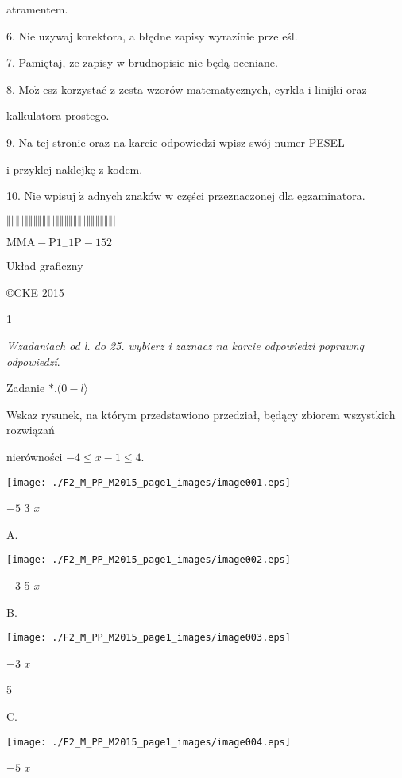 \documentclass[a4paper,12pt]{article}
\begin{document}
atramentem.

6. Nie uzywaj korektora, a błędne zapisy wyrazínie prze eśl.

7. Pamiętaj, $\dot{\mathrm{z}}\mathrm{e}$ zapisy w brudnopisie nie będą oceniane.

8. $\mathrm{M}\mathrm{o}\dot{\mathrm{z}}$ esz korzystać z zesta wzorów matematycznych, cyrkla i linijki oraz

kalkulatora prostego.

9. Na tej stronie oraz na karcie odpowiedzi wpisz swój numer PESEL

i przyklej naklejkę z kodem.

10. Nie wpisuj $\dot{\mathrm{z}}$ adnych znaków w części przeznaczonej dla egzaminatora.

$\Vert\Vert\Vert\Vert\Vert\Vert\Vert\Vert\Vert\Vert\Vert\Vert\Vert\Vert\Vert\Vert\Vert\Vert\Vert\Vert\Vert\Vert\Vert\Vert|$

$\mathrm{M}\mathrm{M}\mathrm{A}-\mathrm{P}1_{-}1\mathrm{P}-152$

Układ graficzny

\copyright CKE 2015

1




{\it Wzadaniach od l. do 25. wybierz i zaznacz na karcie odpowiedzi poprawnq odpowiedzí}.

Zadanie $*.(0-l\rangle$

Wskaz rysunek, na którym przedstawiono przedział, będący zbiorem wszystkich rozwiązań

nierówności $-4\leq x-1\leq 4.$
\begin{center}
\texttt{[image: ./F2\_M\_PP\_M2015\_page1\_images/image001.eps]}
\end{center}
$-5$  3  {\it x}

A.
\begin{center}
\texttt{[image: ./F2\_M\_PP\_M2015\_page1\_images/image002.eps]}
\end{center}
$-3$  5  {\it x}

B.
\begin{center}
\texttt{[image: ./F2\_M\_PP\_M2015\_page1\_images/image003.eps]}
\end{center}
$-3$  {\it x}

5

C.
\begin{center}
\texttt{[image: ./F2\_M\_PP\_M2015\_page1\_images/image004.eps]}
\end{center}
$-5$  {\it x}
\end{document}
